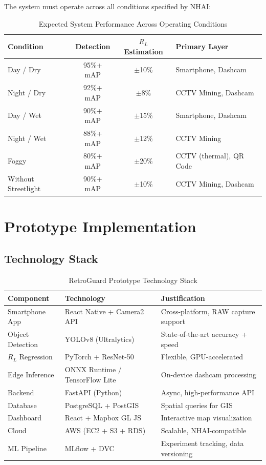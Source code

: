 \documentclass[11pt,a4paper]{article}
\begin{document}
The system must operate across all conditions specified by NHAI:

\begin{table}[H]
\centering
\caption{Expected System Performance Across Operating Conditions}
\label{tab:conditions}
\begin{tabular}{@{}lccl@{}}
\toprule
\textbf{Condition} & \textbf{Detection} & \textbf{$R_L$ Estimation} & \textbf{Primary Layer} \\
\midrule
Day / Dry & 95\%+ mAP & $\pm$10\% & Smartphone, Dashcam \\
Night / Dry & 92\%+ mAP & $\pm$8\% & CCTV Mining, Dashcam \\
Day / Wet & 90\%+ mAP & $\pm$15\% & Smartphone, Dashcam \\
Night / Wet & 88\%+ mAP & $\pm$12\% & CCTV Mining \\
Foggy & 80\%+ mAP & $\pm$20\% & CCTV (thermal), QR Code \\
Without Streetlight & 90\%+ mAP & $\pm$10\% & CCTV Mining, Dashcam \\
\bottomrule
\end{tabular}
\end{table}


\section{Prototype Implementation}
\label{sec:prototype}

\subsection{Technology Stack}

\begin{table}[H]
\centering
\caption{RetroGuard Prototype Technology Stack}
\label{tab:tech_stack}
\begin{tabular}{@{}lll@{}}
\toprule
\textbf{Component} & \textbf{Technology} & \textbf{Justification} \\
\midrule
Smartphone App & React Native + Camera2 API & Cross-platform, RAW capture support \\
Object Detection & YOLOv8 (Ultralytics) & State-of-the-art accuracy + speed \\
$R_L$ Regression & PyTorch + ResNet-50 & Flexible, GPU-accelerated \\
Edge Inference & ONNX Runtime / TensorFlow Lite & On-device dashcam processing \\
Backend & FastAPI (Python) & Async, high-performance API \\
Database & PostgreSQL + PostGIS & Spatial queries for GIS \\
Dashboard & React + Mapbox GL JS & Interactive map visualization \\
Cloud & AWS (EC2 + S3 + RDS) & Scalable, NHAI-compatible \\
ML Pipeline & MLflow + DVC & Experiment tracking, data versioning \\
\bottomrule
\end{tabular}
\end{table}
\end{document}
